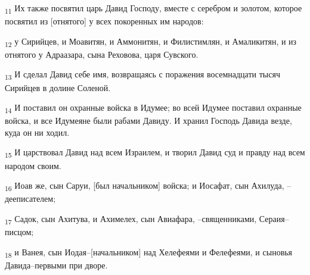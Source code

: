 \begin{tcolorbox}
\textsubscript{11} Их также посвятил царь Давид Господу, вместе с серебром и золотом, которое посвятил из [отнятого] у всех покоренных им народов:
\end{tcolorbox}
\begin{tcolorbox}
\textsubscript{12} у Сирийцев, и Моавитян, и Аммонитян, и Филистимлян, и Амаликитян, и из отнятого у Адраазара, сына Реховова, царя Сувского.
\end{tcolorbox}
\begin{tcolorbox}
\textsubscript{13} И сделал Давид себе имя, возвращаясь с поражения восемнадцати тысяч Сирийцев в долине Соленой.
\end{tcolorbox}
\begin{tcolorbox}
\textsubscript{14} И поставил он охранные войска в Идумее; во всей Идумее поставил охранные войска, и все Идумеяне были рабами Давиду. И хранил Господь Давида везде, куда он ни ходил.
\end{tcolorbox}
\begin{tcolorbox}
\textsubscript{15} И царствовал Давид над всем Израилем, и творил Давид суд и правду над всем народом своим.
\end{tcolorbox}
\begin{tcolorbox}
\textsubscript{16} Иоав же, сын Саруи, [был начальником] войска; и Иосафат, сын Ахилуда, --дееписателем;
\end{tcolorbox}
\begin{tcolorbox}
\textsubscript{17} Садок, сын Ахитува, и Ахимелех, сын Авиафара, --священниками, Сераия--писцом;
\end{tcolorbox}
\begin{tcolorbox}
\textsubscript{18} и Ванея, сын Иодая--[начальником] над Хелефеями и Фелефеями, и сыновья Давида--первыми при дворе.
\end{tcolorbox}
